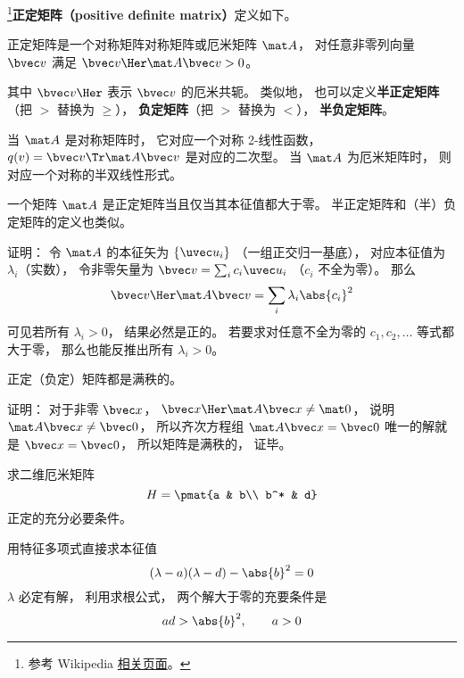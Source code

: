 

\footnote{参考 Wikipedia \href{https://en.wikipedia.org/wiki/Definite_matrix}{相关页面}。}\textbf{正定矩阵（positive definite matrix）}定义如下。
\begin{definition}{}
正定矩阵是一个对称矩阵对称矩阵或厄米矩阵 $\mat A$， 对任意非零列向量 $\bvec v$ 满足 $\bvec v\Her \mat A \bvec v > 0$。
\end{definition}
其中 $\bvec v\Her$ 表示 $\bvec v$ 的厄米共轭。 类似地， 也可以定义\textbf{半正定矩阵}（把 $>$ 替换为 $\geqslant$）， \textbf{负定矩阵}（把 $>$ 替换为 $<$）， \textbf{半负定矩阵}。

当 $\mat A$ 是对称矩阵时， 它对应一个对称 2-线性函数， $q(v) = \bvec v\Tr \mat A \bvec v$ 是对应的二次型。 当 $\mat A$ 为厄米矩阵时， 则对应一个对称的半双线性形式。

\begin{theorem}{}
一个矩阵 $\mat A$ 是正定矩阵当且仅当其本征值都大于零。 半正定矩阵和（半）负定矩阵的定义也类似。
\end{theorem}

证明： 令 $\mat A$ 的本征矢为 $\{\uvec u_i\}$ （一组正交归一基底）， 对应本征值为 $\lambda_i$（实数）， 令非零矢量为 $\bvec v = \sum_i c_i \uvec u_i$ （$c_i$ 不全为零）。 那么
\begin{equation}
\bvec v\Her \mat A \bvec v = \sum_i \lambda_i \abs{c_i}^2
\end{equation}
可见若所有 $\lambda_i > 0$， 结果必然是正的。 若要求对任意不全为零的 $c_1,c_2,\dots$ 等式都大于零， 那么也能反推出所有 $\lambda_i > 0$。

\begin{theorem}{}
正定（负定）矩阵都是满秩的。
\end{theorem}
证明： 对于非零 $\bvec x$， $\bvec x\Her \mat A \bvec x \ne \mat 0$， 说明 $\mat A\bvec x \ne \bvec 0$， 所以齐次方程组 $\mat A\bvec x = \bvec 0$ 唯一的解就是 $\bvec x = \bvec 0$， 所以矩阵是满秩的， 证毕。

\begin{example}{}
求二维厄米矩阵
\begin{equation}
H = \pmat{a & b\\ b^* & d}
\end{equation}
正定的充分必要条件。

用特征多项式直接求本征值
\begin{equation}
(\lambda - a)(\lambda - d) - \abs{b}^2 = 0
\end{equation}
$\lambda$ 必定有解， 利用求根公式， 两个解大于零的充要条件是
\begin{equation}
ad > \abs{b}^2, \qquad
a > 0
\end{equation}
\end{example}
